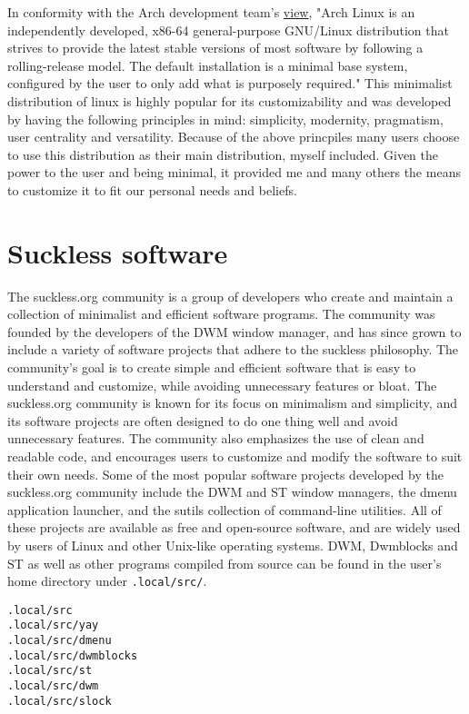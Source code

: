 \documentclass{article}
\begin{document}
In conformity with the Arch development team's \href{https://wiki.archlinux.org/title/Arch_Linux}{view},
\newline
"Arch Linux is an independently developed, x86-64 general-purpose GNU/Linux distribution that strives to provide the latest stable versions of most software by following a rolling-release model. The default installation is a minimal base system, configured by the user to only add what is purposely required."
\newline
\newline
This minimalist distribution of linux is highly popular for its customizability and was developed by having the following principles in mind: simplicity, modernity, pragmatism, user centrality and versatility.
\newline
Because of the above princpiles many users choose to use this distribution as their main distribution, myself included.
Given the power to the user and being minimal, it provided me and many others the means to customize it to fit our personal needs and beliefs. 

\clearpage
\section{Suckless software}

The suckless.org community is a group of developers who create and maintain a collection of minimalist and efficient software programs. The community was founded by the developers of the DWM window manager, and has since grown to include a variety of software projects that adhere to the suckless philosophy. The community's goal is to create simple and efficient software that is easy to understand and customize, while avoiding unnecessary features or bloat.
\newline
\newline
The suckless.org community is known for its focus on minimalism and simplicity, and its software projects are often designed to do one thing well and avoid unnecessary features. The community also emphasizes the use of clean and readable code, and encourages users to customize and modify the software to suit their own needs.
\newline
\newline
Some of the most popular software projects developed by the suckless.org community include the DWM and ST window managers, the dmenu application launcher, and the sutils collection of command-line utilities. All of these projects are available as free and open-source software, and are widely used by users of Linux and other Unix-like operating systems.
\newline
\newline
DWM, Dwmblocks and ST as well as other programs compiled from source can be found in the user's home directory under \texttt{.local/src/}. 
\begin{lstlisting}
.local/src
.local/src/yay
.local/src/dmenu
.local/src/dwmblocks
.local/src/st
.local/src/dwm
.local/src/slock
\end{lstlisting}
\end{document}
